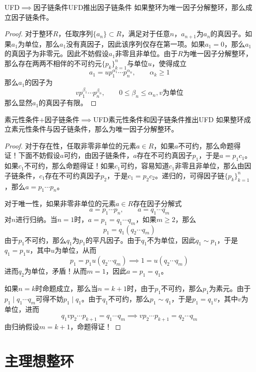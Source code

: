 \documentclass[lang = cn, scheme = chinese, thmcnt = section]{elegantbook}
\newcommand{\sub}{\subset}             %
\begin{document}
\begin{theorem}{UFD$\implies$因子链条件}{UFD推出因子链条件}
	如果整环为唯一因子分解整环，那么成立因子链条件。
\end{theorem}

\begin{proof}
	对于整环$R$，任取序列$\{a_n\}\sub R$，满足对于任意$n$，$a_{n+1}$为$a_{n}$的真因子。如果$a_1$为单位，那么$a_1$没有真因子，因此该序列仅存在第一项。如果$a_1=0$，那么$a_1$的真因子为非零元。因此不妨假设$a_1$非零且非单位。由于$R$为唯一因子分解整环，那么存在两两不相伴的不可约元$\{p_k\}_{k=1}^{n}$与单位$u$，使得成立
	$$
	a_1=up_1^{\alpha_1}\cdots p_n^{\alpha_n},\qquad \alpha_k\ge 1
	$$
	那么$a_1$的因子为
	$$
	vp_1^{\beta_1}\cdots p_n^{\beta_n},\qquad 0\le\beta_n\le\alpha_n,v\text{为单位}
	$$
	那么显然$a_1$的真因子有限。
\end{proof}

\begin{theorem}{素元性条件$+$因子链条件$\implies$UFD}{素元性条件和因子链条件推出UFD}
	如果整环成立素元性条件与因子链条件，那么为唯一因子分解整环。
\end{theorem}

\begin{proof}
	对于存在性，任取非零非单位的元素$a\in R$，如果$a$不可约，那么命题得证！下面不妨假设$a$可约，由因子链条件，$a$存在不可约真因子$p_1$，于是$a=p_1c_1$。如果$c_1$不可约，那么命题得证！如果$c_1$可约，容易知道$c_1$非零且非单位，那么由因子链条件，$c_1$存在不可约真因子$p_2$，于是$c_1=p_2c_2$。递归的，可得因子链$\{p_k\}_{k=1}^{n}$，那么$a=p_1\cdots p_n$。
	
	对于唯一性，如果非零非单位的元素$a\in R$存在因子分解式
	$$
	a=p_1\cdots p_n,\qquad a=q_1\cdots q_m
	$$
	对$n$进行归纳。当$n=1$时，$a=p_1=q_1\cdots q_m$，如果$m\ge2$，那么
	$$
	p_1=q_1(q_2\cdots q_m)
	$$
	由于$p_1$不可约，那么$q_1$为$p_1$的平凡因子。由于$q_1$不为单位，因此$q_1\sim p_1$，于是$q_1=p_1u$，其中$u$为单位，从而
	$$
	p_1=p_1u(q_2\cdots q_m)\implies 1=u(q_2\cdots q_m)
	$$
	进而$q_2$为单位，矛盾！从而$m=1$，因此$a=p_1=q_1$。
	
	如果$n=k$时命题成立，那么当$n=k+1$时，由于$p_1$不可约，那么$p_1$为素元。由于$p_1\mid q_1\cdots q_m$可得不妨$p_1\mid q_1$。由于$q_1$不可约，那么$p_1\sim q_1$，于是$p_1=q_1v$，其中$v$为单位，进而
	$$
	q_1vp_2\cdots p_{k+1}=q_1\cdots q_m\implies vp_2\cdots p_{k+1}=q_2\cdots q_m
	$$
	由归纳假设$m=k+1$，命题得证！
\end{proof}

\section{主理想整环}
\end{document}
